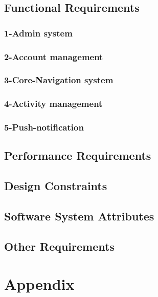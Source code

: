\documentclass[a4paper,12pt]{article}
\begin{document}
\subsection{Functional Requirements}
\subsubsection{1-Admin system}
\subsubsection{2-Account management}
\subsubsection{3-Core-Navigation system}
\subsubsection{4-Activity management}
\subsubsection{5-Push-notification}
\subsection{Performance Requirements}
\subsection{Design Constraints}
\subsection{Software System Attributes}
\subsection{Other Requirements}
\section{Appendix}
\newpage
\end{document}
